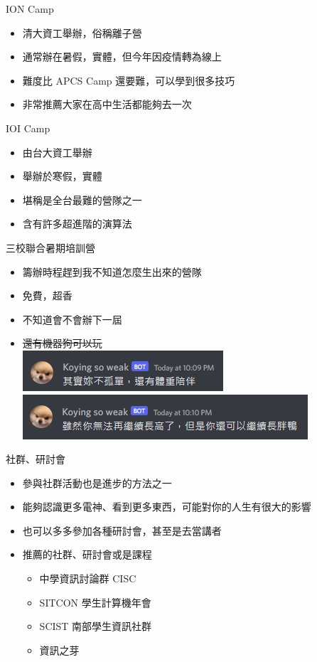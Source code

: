 \documentclass[aspectratio=169]{beamer}
\begin{document}
	\begin{frame}{ION Camp}
		\begin{itemize}
			\item 清大資工舉辦，俗稱離子營
			\item 通常辦在暑假，實體，但今年因疫情轉為線上
			\item 難度比 APCS Camp 還要難，可以學到很多技巧
			\item 非常推薦大家在高中生活都能夠去一次
		\end{itemize}
	\end{frame}

	\begin{frame}{IOI Camp}
		\begin{itemize}
			\item 由台大資工舉辦
			\item 舉辦於寒假，實體
			\item 堪稱是全台最難的營隊之一
			\item 含有許多超進階的演算法
		\end{itemize}
	\end{frame}

	\begin{frame}{三校聯合暑期培訓營}
		\begin{itemize}
			\item 籌辦時程趕到我不知道怎麼生出來的營隊
			\item 免費，超香
			\item 不知道會不會辦下一屆
			\item<2-> \sout{還有機器狗可以玩}\\
			\includegraphics[height=0.15\textheight]{./src/doggg_2.png}
			\includegraphics[height=0.15\textheight]{./src/doggg_1.png}
		\end{itemize}
	\end{frame}

	\begin{frame}{社群、研討會}
		\begin{itemize}
			\item<1-> 參與社群活動也是進步的方法之一
			\item<2-> 能夠認識更多電神、看到更多東西，可能對你的人生有很大的影響
			\item<2-> 也可以多多參加各種研討會，甚至是去當講者
			\item<3-> 推薦的社群、研討會或是課程
				\begin{itemize}
					\item 中學資訊討論群 CISC
					\item SITCON 學生計算機年會
					\item SCIST 南部學生資訊社群
					\item 資訊之芽
				\end{itemize}
		\end{itemize}
	\end{frame}
\end{document}
